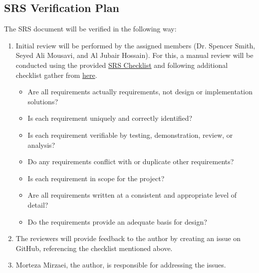 \documentclass[12pt, titlepage]{article}
\begin{document}
\newpage


\subsection{SRS Verification Plan}

The SRS document will be verified in the following way:

\begin{enumerate}
  \item Initial review will be performed by the assigned members
        (Dr. Spencer Smith, Seyed Ali Mousavi, and Al Jubair Hossain).
        For this, a manual review will be conducted using the provided
        \href{https://github.com/mirzaim/ipcs/blob/main/docs/Checklists/SRS-Checklist.pdf}{SRS Checklist}
        and following additional checklist gather from
        \href{https://www.cs.toronto.edu/~sme/CSC340F/2005/assignments/inspections/reqts_checklist.pdf}{here}.
        \begin{itemize}\renewcommand{\labelitemi}{\scriptsize$\square$}
          \item Are all requirements actually requirements, not design or implementation solutions?
          \item Is each requirement uniquely and correctly identified?
          \item Is each requirement verifiable by testing, demonstration, review, or analysis?
          \item Do any requirements conflict with or duplicate other requirements?
          \item Is each requirement in scope for the project?
          \item Are all requirements written at a consistent and appropriate level of detail?
          \item Do the requirements provide an adequate basis for design?
        \end{itemize}
  \item The reviewers will provide feedback to the author by creating an issue on GitHub,
        referencing the checklist mentioned above.
  \item Morteza Mirzaei, the author, is responsible for addressing the issues.
\end{enumerate}
\end{document}
